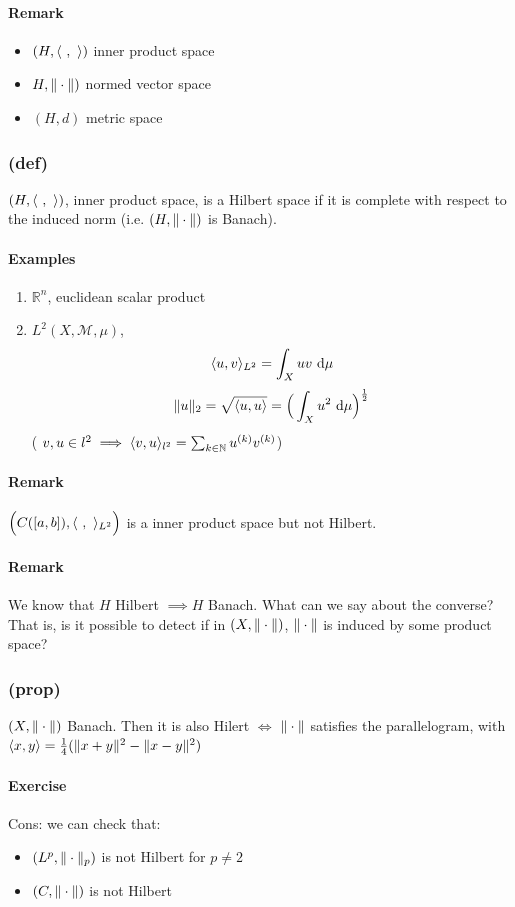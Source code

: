 \paragraph{Remark}
\begin{itemize}
    \item $(H,\langle {\ } , {\ } \rangle)$ inner product space
    \item $H,\Vert \cdot \Vert )$ normed vector space
    \item $(H, d)$ metric space
\end{itemize}
\subsubsection{(def)}
$(H,\langle {\ } , {\ } \rangle)$, inner product space, is a Hilbert space if it is complete with respect to the induced norm (i.e. $(H,\Vert \cdot \Vert)$ is Banach).
\paragraph{Examples}
\begin{enumerate}
    \item $\mathbb R^n$, euclidean scalar product 
    \item $L^2(X,\mathcal M,\mu)$,
    $$\langle {u} , {v} \rangle _{L^2}=\int_Xuv\ \mathrm d\mu$$
    $$\Vert u\Vert_2=\sqrt{\langle {u} , {u} \rangle}=\Big ( \int_Xu^2\ \mathrm d\mu\Big )^{\frac 12}$$
    ( $v,u\in l^2\implies \langle {v} , {u} \rangle_{l^2}=\sum_{k\in \mathbb N}u^{(k)}v^{(k)}$)
\end{enumerate}
\paragraph{Remark}
$\Big (C([a,b]), \langle {\ } , {\ } \rangle_{L^2}\Big )$ is a inner product space but not Hilbert.

\paragraph{Remark}
We know that $H$ Hilbert $\implies H$ Banach.
What can we say about the converse?
That is, is it possible to detect if in $(X,\Vert \cdot \Vert)$, $\Vert \cdot \Vert$ is induced by some product space?
\subsubsection{(prop)}
$(X,\Vert \cdot \Vert)$ Banach. Then it is also Hilert $\iff$ $\Vert \cdot \Vert$ satisfies the parallelogram, with $\langle {x} , {y} \rangle = \frac 14 (\Vert x+y\Vert ^2-\Vert x-y\Vert ^2)$
\paragraph{Exercise} Cons: we can check that:
\begin{itemize}
    \item $(L^p,\Vert \cdot \Vert_p)$ is not Hilbert for $p\neq 2$
    \item $(C,\Vert \cdot \Vert)$ is not Hilbert 

\end{itemize}

